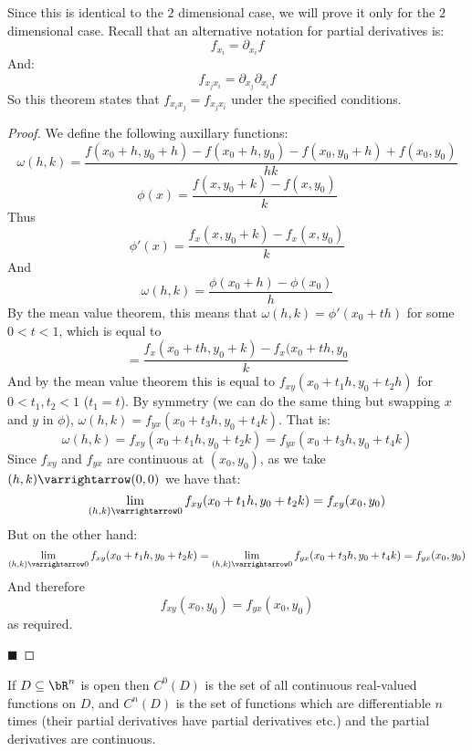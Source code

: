\documentclass[10pt]{article}
\begin{document}
Since this is identical to the $2$ dimensional case, we will prove it only for the $2$ dimensional case.
Recall that an alternative notation for partial derivatives is:
\[ f_{x_i} = \partial_{x_i}f \]
And:
\[ f_{x_jx_i} = \partial_{x_j}\partial_{x_i}f \]
So this theorem states that $f_{x_ix_j}=f_{x_jx_i}$ under the specified conditions.

\begin{proof}

    We define the following auxillary functions:
    \[ \omega(h,k) = \frac{f(x_0+h,y_0+h)-f(x_0+h,y_0)-f(x_0,y_0+h)+f(x_0,y_0)}{hk} \]
    \[ \phi(x) = \frac{f(x,y_0+k)-f(x,y_0)}k \]
    Thus
    \[ \phi'(x) = \frac{f_x(x,y_0+k)-f_x(x,y_0)}k \]
    And
    \[ \omega(h,k) = \frac{\phi(x_0+h)-\phi(x_0)}h \]
    By the mean value theorem, this means that $\omega(h,k)=\phi'(x_0+th)$ for some $0<t<1$, which is equal to
    \[ = \frac{f_x(x_0+th, y_0+k)-f_x(x_0+th,y_0}k \]
    And by the mean value theorem this is equal to $f_{xy}(x_0+t_1h,y_0+t_2h)$ for $0<t_1,t_2<1$ ($t_1=t$).
    By symmetry (we can do the same thing but swapping $x$ and $y$ in $\phi$), $\omega(h,k)=f_{yx}(x_0+t_3h,y_0+t_4k)$.
    That is:
    \[ \omega(h,k) = f_{xy}(x_0+t_1h,y_0+t_2k) = f_{yx}(x_0+t_3h,y_0+t_4k) \]
    Since $f_{xy}$ and $f_{yx}$ are continuous at $(x_0,y_0)$, as we take $(h,k)\varrightarrow(0,0)$ we have that:
    \[ \lim_{(h,k)\varrightarrow0} f_{xy}(x_0+t_1h,y_0+t_2k) = f_{xy}(x_0,y_0) \]
    But on the other hand:
    \[ \lim_{(h,k)\varrightarrow0} f_{xy}(x_0+t_1h,y_0+t_2k) = \lim_{(h,k)\varrightarrow0}f_{yx}(x_0+t_3h,y_0+t_4k) = f_{yx}(x_0,y_0) \]
    And therefore
    \[ f_{xy}(x_0,y_0) = f_{yx}(x_0,y_0) \]
    as required.

    \hfill$\blacksquare$

\end{proof}

\begin{defn*}

    If $D\subseteq\bR^n$ is open then $C^0(D)$ is the set of all continuous real-valued functions on $D$, and $C^n(D)$ is the set of functions which are differentiable $n$ times (their partial derivatives
    have partial derivatives etc.) and the partial derivatives are continuous.

\end{defn*}
\end{document}
